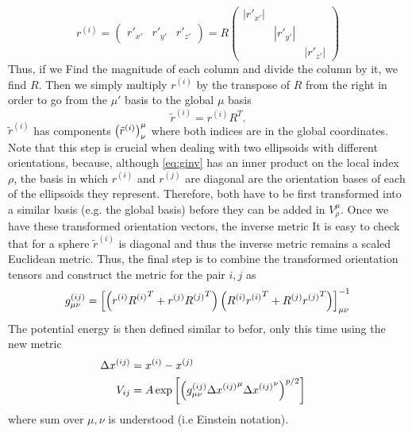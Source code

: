 \documentclass[nofootinbib,preprint,floatfix,titlepage,superscriptaddress]{revtex4} %
\begin{document}
\begin{equation}
    r^{(i)} = \left(\begin{array}{c|c|c}r'_{x'} & r'_{y'} &r'_{z'}\end{array}
    \right) = R \begin{pmatrix}
    |r'_{x'}| \\ 
    & |r'_{y'}|\\ 
    & &|r'_{z'}|
    \end{pmatrix}
\end{equation}
Thus, if we Find the magnitude of each column and divide the column by it, we find $R$. 
Then we simply multiply $r^{(i)}$ by the transpose of $R$ from the right in order to go from the $\mu'$ basis to the global $\mu$ basis 
\[\tilde{r}^{(i)} = r^{(i)}R^T. \]
$\tilde{r}^{(i)}$ has components $\left({\tilde{r}^{(i)}}\right)^\mu_\nu$ where both indices are in the global coordinates.
Note that this step is crucial when dealing with two ellipsoids with different orientations, because, although \eqref{eq:ginv} has an inner product on the local index $\rho$, the basis in which $r^{(i)}$ and $r^{(j)}$ are diagonal are the orientation bases of each of the ellipsoids they represent. 
Therefore, both have to be first transformed into a similar basis (e.g. the global basis) before they can be added in $V^{\mu}_\rho$. 
Once we have these transformed orientation vectors, the inverse metric 
It is easy to check that for a sphere $\tilde{r}^{(i)}$ is diagonal and thus the inverse metric remains a scaled Euclidean metric. 
Thus, the final step is to combine the transformed orientation tensors and construct the metric for the pair $i,j$ as 
\begin{equation}
    g_{\mu\nu}^{(ij)} = \left[\left(r^{(i)}{R^{(i)}}^T+ r^{(j)}{R^{(j)}}^T\right) \left(R^{(i)}{r^{(i)}}^T+ R^{(j)}{r^{(j)}}^T\right) \right]^{-1}_{\mu\nu}
\end{equation}
The potential energy is then defined similar to befor, only this time using the new metric 
\begin{align}
    \Delta {x^{(ij)}} &= x^{(i)} - x^{(j)}\cr
    V_{ij} &= A\exp\left[\left(
    g_{\mu\nu}^{(ij)} \Delta {x^{(ij)}}^\mu \Delta {x^{(ij)}}^\nu \right)^{p/2}   \right]
    \label{eq:Vij-ell}
\end{align}
where sum over $\mu,\nu$ is understood (i.e Einstein notation).
\end{document}
